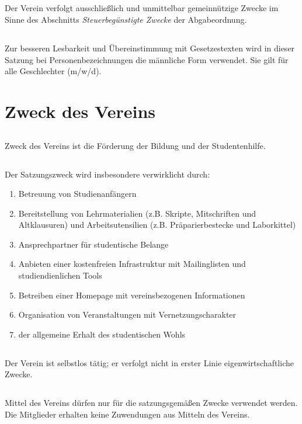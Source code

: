 \documentclass[12pt]{article}
\begin{document}
\subsection{}
Der Verein verfolgt ausschließlich und unmittelbar gemeinnützige Zwecke im Sinne des Abschnitts \textit{\glqq{}Steuerbegünstigte Zwecke\grqq{}} der Abgabeordnung.
\subsection{}
Zur besseren Lesbarkeit und Übereinstimmung mit Gesetzestexten wird in dieser Satzung bei Personenbezeichnungen die männliche Form verwendet. Sie gilt für alle Geschlechter (m/w/d).

\section{Zweck des Vereins}
\subsection{}
Zweck des Vereins ist die Förderung der Bildung und der Studentenhilfe.
\subsection{}
Der Satzungszweck wird insbesondere verwirklicht durch:
\begin{enumerate}
    \item Betreuung von Studienanfängern
    \item Bereitstellung von Lehrmaterialien (z.B. Skripte, Mitschriften und Altklausuren) und Arbeitsutensilien (z.B. Präparierbestecke und Laborkittel)
    \item Ansprechpartner für studentische Belange
    \item Anbieten einer kostenfreien Infrastruktur mit Mailinglisten und studiendienlichen Tools
    \item Betreiben einer Homepage mit vereinsbezogenen Informationen
    \item Organisation von Veranstaltungen mit Vernetzungscharakter
    \item der allgemeine Erhalt des studentischen Wohls
\end{enumerate}
\subsection{}
Der Verein ist selbstlos tätig; er verfolgt nicht in erster Linie eigenwirtschaftliche Zwecke.
\subsection{}
Mittel des Vereins dürfen nur für die satzungsgemäßen Zwecke verwendet werden. Die Mitglieder erhalten keine Zuwendungen aus Mitteln des Vereins.
\end{document}
